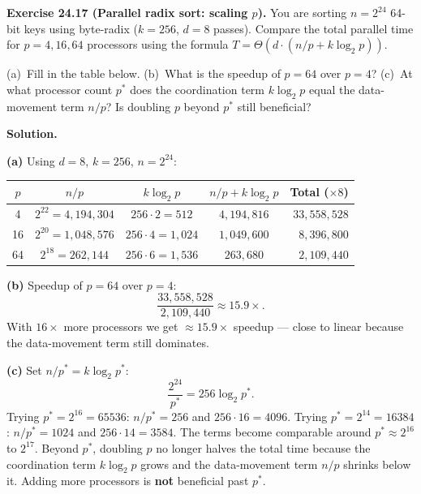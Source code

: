 \begin{ppexercises}
\textbf{Exercise 24.17 (Parallel radix sort: scaling $p$).}
You are sorting $n = 2^{24}$ 64-bit keys using byte-radix ($k = 256$,
$d = 8$ passes). Compare the total parallel time for $p = 4, 16, 64$
processors using the formula $T = \Theta(d \cdot (n/p + k \log_2 p))$.

(a)~Fill in the table below.
(b)~What is the speedup of $p = 64$ over $p = 4$?
(c)~At what processor count $p^*$ does the coordination term
$k \log_2 p$ equal the data-movement term $n/p$? Is doubling $p$
beyond $p^*$ still beneficial?

\medskip
\textbf{Solution.}

\textbf{(a)} Using $d = 8$, $k = 256$, $n = 2^{24}$:

\begin{center}
\begin{tabular}{ccccr}
\toprule
$p$ & $n/p$ & $k\log_2 p$ & $n/p + k\log_2 p$ & \textbf{Total ($\times 8$)} \\
\midrule
4  & $2^{22} = 4{,}194{,}304$ & $256 \cdot 2 = 512$ & $4{,}194{,}816$ & $33{,}558{,}528$ \\
16 & $2^{20} = 1{,}048{,}576$ & $256 \cdot 4 = 1{,}024$ & $1{,}049{,}600$ & $8{,}396{,}800$ \\
64 & $2^{18} = 262{,}144$ & $256 \cdot 6 = 1{,}536$ & $263{,}680$ & $2{,}109{,}440$ \\
\bottomrule
\end{tabular}
\end{center}

\textbf{(b)} Speedup of $p = 64$ over $p = 4$:
\[
\frac{33{,}558{,}528}{2{,}109{,}440} \approx \mathbf{15.9\times}.
\]
With $16\times$ more processors we get $\approx 15.9\times$ speedup ---
close to linear because the data-movement term still dominates.

\textbf{(c)} Set $n/p^* = k \log_2 p^*$:
\[
\frac{2^{24}}{p^*} = 256 \log_2 p^*.
\]
Trying $p^* = 2^{16} = 65536$: $n/p^* = 256$ and $256 \cdot 16 = 4096$.
Trying $p^* = 2^{14} = 16384$: $n/p^* = 1024$ and $256 \cdot 14 = 3584$.
The terms become comparable around $p^* \approx 2^{16}$ to $2^{17}$.
Beyond $p^*$, doubling $p$ no longer halves the total time because the
coordination term $k \log_2 p$ grows and the data-movement term $n/p$
shrinks below it. Adding more processors is \textbf{not} beneficial
past $p^*$.
\end{ppexercises}

